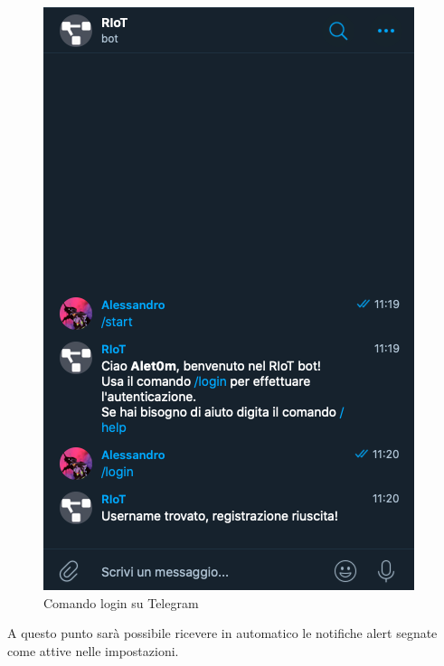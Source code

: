 		\begin{figure}[H]
		\centering
		\includegraphics[scale=0.600]{res/images/membro/loginTelegram.png}
		\caption{Comando login su Telegram}
	\end{figure}
	A questo punto sarà possibile ricevere in automatico le notifiche alert segnate come attive nelle impostazioni.
 

